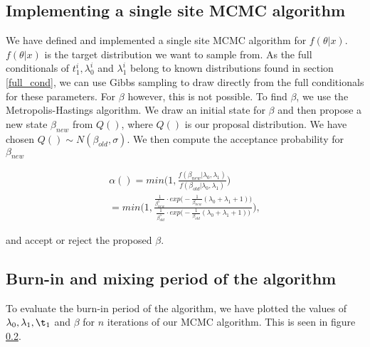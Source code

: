 \subsection{Implementing a single site MCMC algorithm}

We have defined and implemented a single site MCMC algorithm for $f(\theta |x)$. $f(\theta|x)$ is the target distribution we want to sample from.  As the full conditionals of $t_1^i, \lambda_0^i$ and $\lambda_1^i$ belong to known distributions found in section \ref{full_cond}, we can use Gibbs sampling to draw directly from the full conditionals for these parameters. For $\beta$ however, this is not possible.
To find $\beta$, we use the Metropolis-Hastings algorithm. We draw an initial state for $\beta$ and then propose a new state $\beta_{new}$ from $Q()$, where $Q()$ is our proposal distribution. We have chosen $Q() \sim N(\beta_{old}, \sigma)$. We then compute the acceptance probability for $\beta_{new}$

\begin{align}
    \alpha() = min \Big( 1, \frac{f(\beta_{new}| \lambda_0, \lambda_1)}{f(\beta_{old}| \lambda_0, \lambda_1)} \Big) \nonumber \\ 
    = min \Big( 1, \frac{\frac{1}{\beta_{new}^5}\cdot exp \big( -\frac{1}{\beta_{new}}(\lambda_0 + \lambda_1 + 1)  \big)}{\frac{1}{\beta_{old}^5}\cdot exp \big( -\frac{1}{\beta_{old}}(\lambda_0 + \lambda_1 + 1)  \big)} \Big),
\end{align}

and accept or reject the proposed $\beta$. 


\subsection{Burn-in and mixing period of the algorithm}

To evaluate the burn-in period of the algorithm, we have plotted the values of $\lambda_0, \lambda_1, \t_1$ and $\beta$ for $n$ iterations of our MCMC algorithm. This is seen in figure \ref{}. 

